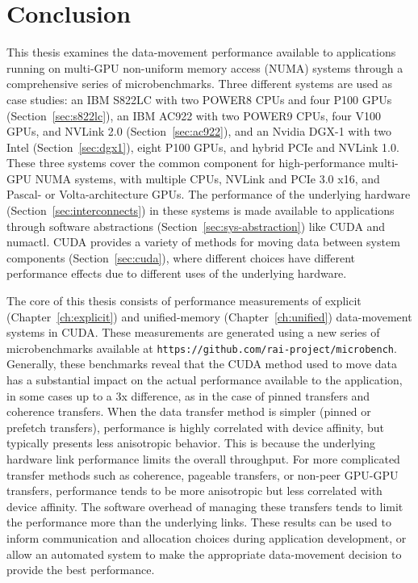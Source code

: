 \chapter{Conclusion}
\label{ch:conclusion}

This thesis examines the data-movement performance available to applications running on multi-GPU non-uniform memory access (NUMA) systems through a comprehensive series of microbenchmarks.
Three different systems are used as case studies: an IBM S822LC with two POWER8 CPUs and four P100 GPUs (Section~\ref{sec:s822lc}), an IBM AC922 with two POWER9 CPUs, four V100 GPUs, and NVLink 2.0 (Section~\ref{sec:ac922}), and an Nvidia DGX-1 with two Intel (Section~\ref{sec:dgx1}), eight P100 GPUs, and hybrid PCIe and NVLink 1.0.
These three systems cover the common component for high-performance multi-GPU NUMA systems, with multiple CPUs, NVLink and PCIe 3.0 x16, and Pascal- or Volta-architecture GPUs.
The performance of the underlying hardware (Section~\ref{sec:interconnects}) in these systems is made available to applications through software abstractions (Section~\ref{sec:sys-abstraction}) like CUDA and numactl.
CUDA provides a variety of methods for moving data between system components (Section~\ref{sec:cuda}), where different choices have different performance effects due to different uses of the underlying hardware.

The core of this thesis consists of performance measurements of explicit (Chapter~\ref{ch:explicit}) and unified-memory (Chapter~\ref{ch:unified}) data-movement systems in CUDA.
These measurements are generated using a new series of microbenchmarks available at \texttt{https://github.com/rai-project/microbench}.
Generally, these benchmarks reveal that the CUDA method used to move data has a substantial impact on the actual performance available to the application, in some cases up to a 3x difference, as in the case of pinned transfers and coherence transfers.
When the data transfer method is simpler (pinned or prefetch transfers), performance is highly correlated with device affinity, but typically presents less anisotropic behavior.
This is because the underlying hardware link performance limits the overall throughput.
For more complicated transfer methods such as coherence, pageable transfers, or non-peer GPU-GPU transfers, performance tends to be more anisotropic but less correlated with device affinity.
The software overhead of managing these transfers tends to limit the performance more than the underlying links.
These results can be used to inform communication and allocation choices during application development, or allow an automated system to make the appropriate data-movement decision to provide the best performance.

